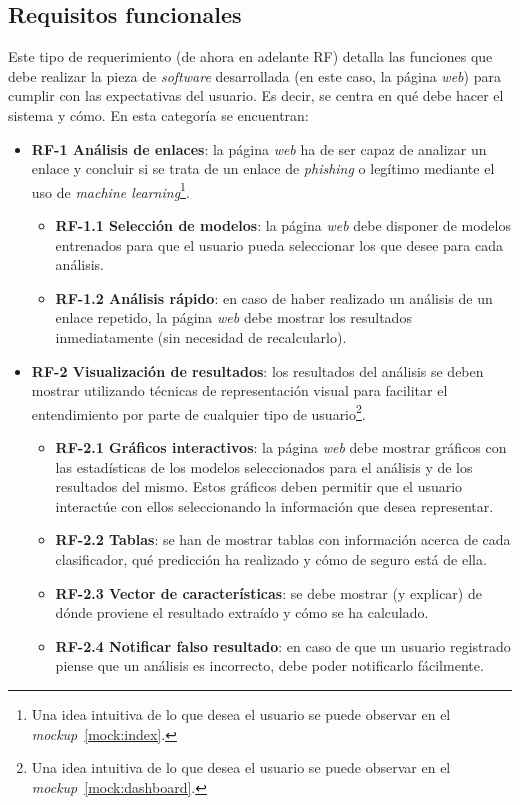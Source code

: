 \subsection{Requisitos funcionales}
\label{s:requisitos-funcionales}

Este tipo de requerimiento (de ahora en adelante RF) detalla las funciones que debe realizar la pieza de \textit{software} desarrollada (en este caso, la página \textit{web}) para cumplir con las expectativas del usuario. Es decir, se centra en qué debe hacer el sistema y cómo. En esta categoría se encuentran:

\begin{itemize}
	\item \textbf{RF-1 Análisis de enlaces}: la página \textit{web} ha de ser capaz de analizar un enlace y concluir si se trata de un enlace de \textit{phishing} o legítimo mediante el uso de \textit{machine learning}\footnote{Una idea intuitiva de lo que desea el usuario se puede observar en el \textit{mockup}~\ref{mock:index}.}.
	\begin{itemize}
		\item \textbf{RF-1.1 Selección de modelos}: la página \textit{web} debe disponer de modelos entrenados para que el usuario pueda seleccionar los que desee para cada análisis.
		\item \textbf{RF-1.2 Análisis rápido}: en caso de haber realizado un análisis de un enlace repetido, la página \textit{web} debe mostrar los resultados inmediatamente (sin necesidad de recalcularlo).
	\end{itemize}
	
	\item \textbf{RF-2 Visualización de resultados}: los resultados del análisis se deben mostrar utilizando técnicas de representación visual para facilitar el entendimiento por parte de cualquier tipo de usuario\footnote{Una idea intuitiva de lo que desea el usuario se puede observar en el \textit{mockup}~\ref{mock:dashboard}.}.
	\begin{itemize}
	\item \textbf{RF-2.1 Gráficos interactivos}: la página \textit{web} debe mostrar gráficos con las estadísticas de los modelos seleccionados para el análisis y de los resultados del mismo. Estos gráficos deben permitir que el usuario interactúe con ellos seleccionando la información que desea representar.
	\item \textbf{RF-2.2 Tablas}: se han de mostrar tablas con información acerca de cada clasificador, qué predicción ha realizado y cómo de seguro está de ella.
	\item \textbf{RF-2.3 Vector de características}: se debe mostrar (y explicar) de dónde proviene el resultado extraído y cómo se ha calculado.
	\item \textbf{RF-2.4 Notificar falso resultado}: en caso de que un usuario registrado piense que un análisis es incorrecto, debe poder notificarlo fácilmente.
	\end{itemize}


\end{itemize}
